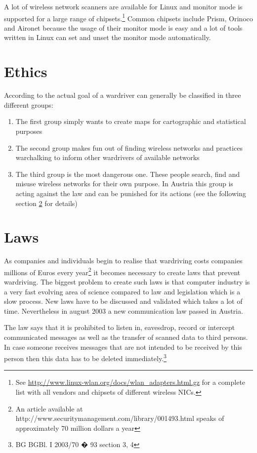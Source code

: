 A lot of wireless network scanners are available for Linux and monitor mode is supported for a large range of chipsets.\footnote{See \url{http://www.linux-wlan.org/docs/wlan_adapters.html.gz} for a complete list with all vendors and chipsets of different wireless NICs.} Common chipsets include Prism, Orinoco and Aironet because the usage of their monitor mode is easy and a lot of tools written in Linux can set and unset the monitor mode automatically.

\section{Ethics}

According to \cite{wardrivingforms} the actual goal of a wardriver can generally be classified in three different groups:
\vspace{-0.5em}
\begin{enumerate}
    \item The first group simply wants to create maps for cartographic and statistical purposes
	\item The second group makes fun out of finding wireless networks and practices warchalking to inform other wardrivers of available networks
	\item The third group is the most dangerous one. These people search, find and misuse wireless networks for their own purpose. In Austria this group is acting against the law and can be punished for its actions (see the following section \ref{sec:laws} for details)
\end{enumerate}

\section{Laws}
\label{sec:laws}

As companies and individuals begin to realise that wardriving costs companies millions of Euros every year\footnote{An article available at http://www.securitymanagement.com/library/001493.html speaks of approximately 70 million dollars a year} it becomes necessary to create laws that prevent wardriving. The biggest problem to create such laws is that computer industry is a very fast evolving area of science compared to law and legislation which is a slow process. New laws have to be discussed and validated which takes a lot of time. Nevertheless in august 2003 a new communication law passed in Austria.

The law says that it is prohibited to listen in, eavesdrop, record or intercept communicated messages as well as the transfer of scanned data to third persons. In case someone receives messages that are not intended to be received by this person then this data has to be deleted immediately.\footnote{BG BGBl. I 2003/70 � 93 section 3, 4}

